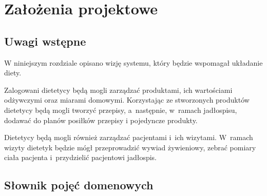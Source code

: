 \chapter{Założenia projektowe}\label{ch:design-assumptions}
\section{Uwagi wstępne}\label{sec:presumptions}
W niniejszym rozdziale opisano wizję systemu, który będzie wspomagał układanie diety.
\par
Zalogowani dietetycy będą mogli zarządzać produktami, ich wartościami odżywczymi oraz
miarami domowymi. Korzystając ze stworzonych produktów dietetycy będą mogli tworzyć
przepisy, a~następnie, w~ramach jadłospisu, dodawać do planów posiłków przepisy
i pojedyncze produkty.
\par
Dietetycy będą mogli również zarządzać pacjentami i~ich wizytami. W~ramach wizyty dietetyk
będzie mógł przeprowadzić wywiad żywieniowy, zebrać pomiary ciała pacjenta i~przydzielić
pacjentowi jadłospis.


\section{Słownik pojęć domenowych}\label{sec:dictionary}


